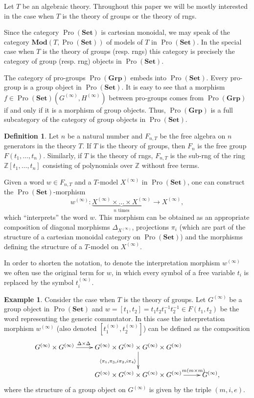 \documentclass{article}
\numberwithin{equation}{section}
\theoremstyle{definition}
\newtheorem{df}[lemma]{Definition} \Crefname{df}{Definition}{Definitions}
\newtheorem{example}[lemma]{Example} \Crefname{example}{Example}{Examples}
\theoremstyle{remark}
\DeclareMathOperator{\Pro}{Pro}
\newcommand{\Set}{\mathbf{Set}}
\newcommand{\Group}{\mathbf{Grp}}
\newcommand{\Mod}{\mathbf{Mod}}
\begin{document}
Let $T$ be an algebraic theory. Throughout this paper we will be mostly interested in the case when $T$ is the theory of groups or the theory of rngs.

Since the category $\Pro(\Set)$ is cartesian monoidal, we may speak of the category $\Mod(T, \Pro(\Set))$ of models of $T$ in \(\Pro(\Set)\).
In the special case when $T$ is the theory of groups (resp. rngs) this category is precisely the category of group (resp. rng) objects in $\Pro(\Set)$.

The category of pro-groups \(\Pro(\Group)\) embeds into \(\Pro(\Set)\). Every pro-group is a group object in \(\Pro(\Set)\). It is easy to see that a morphism \(f \in \Pro(\Set)(G^{(\infty)}, H^{(\infty)})\) between pro-groups comes from \(\Pro(\Group)\) if and only if it is a morphism of group objects. Thus, $\Pro(\Group)$ is a full subcategory of the category of group objects in $\Pro(\Set)$.

\begin{df} \label{df-pro-set-morphisms} 
 Let $n$ be a natural number and $F_{n, T}$ be the free algebra on $n$ generators in the theory $T$.
 If $T$ is the theory of groups, then $F_n$ is the free group $F(t_1,\ldots, t_n)$.
 Similarly, if $T$ is the theory of rngs, $F_{n, T}$ is the sub-rng of the ring $\mathbb{Z}[t_1,\ldots, t_n]$ consisting of polynomials over $\mathbb{Z}$ without free terms.
 
 Given a word $w \in F_{n, T}$ and a $T$-model $X^{(\infty)}$ in $\Pro(\Set)$, one can construct the $\Pro(\Set)$-morphism
 \[ w^{(\infty)} \colon \underbrace{X^{(\infty)} \times \ldots \times X^{(\infty)}}_{n\text{ times}} \to X^{(\infty)}, \]
 which ``interprets'' the word $w$. This morphism can be obtained as an appropriate composition of diagonal morphisms $\Delta_{X^{(\infty)}}$, projections $\pi_i$ 
 (which are part of the structure of a cartesian monoidal category on $\Pro(\Set)$) 
 and the morphisms defining the structure of a $T$-model on $X^{(\infty)}$.
 
 In order to shorten the notation, to denote the interpretation morphism $w^{(\infty)}$ we often use the original term for $w$, in which every symbol of a free variable $t_i$ is replaced by the symbol $t_i^{(\infty)}$.
\end{df}

\begin{example}\label{example-commutator}
Consider the case when $T$ is the theory of groups.
Let $G^{(\infty)}$ be a group object in $\Pro(\Set)$ and $w = [t_1, t_2] = t_1 t_2 t_1^{-1} t_2^{-1} \in F(t_1, t_2)$ be the word representing the generic commutator.
In this case the interpretation morphism $w^{(\infty)}$ (also denoted $[t_1^{(\infty)}, t_2^{(\infty)}]$) can be defined as the composition
 \[ \xymatrix{G^{(\infty)} \times G^{(\infty)} \ar[r]^(.35){\Delta \times \Delta} & G^{(\infty)} \times G^{(\infty)} \times G^{(\infty)} \times G^{(\infty)} \ar[d]_{\langle \pi_1, \pi_3, i\pi_2, i\pi_4 \rangle} & \\
    & G^{(\infty)} \times G^{(\infty)} \times G^{(\infty)} \times G^{(\infty)} \ar[r]^(.76){m(m\times m)} & G^{(\infty)},} \]
where the structure of a group object on $G^{(\infty)}$ is given by the triple $(m, i, e)$.
\end{example}
\end{document}
